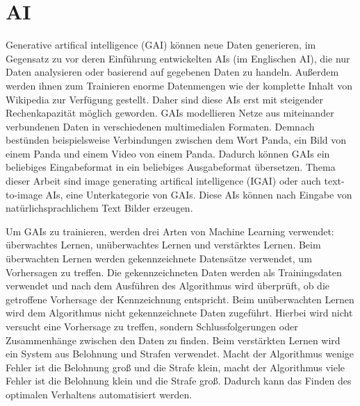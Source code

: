 \documentclass[12pt]{report}
\begin{document}
\section{AI}\label{def_ki}
Generative artifical intelligence (GAI) können neue Daten generieren, im Gegensatz zu vor deren Einführung entwickelten AIs (im Englischen AI), die nur Daten analysieren oder basierend auf gegebenen Daten zu handeln. Außerdem werden ihnen zum Trainieren enorme Datenmengen wie der komplette Inhalt von Wikipedia zur Verfügung gestellt. Daher sind diese AIs erst mit steigender Rechenkapazität möglich geworden. GAIs modellieren Netze aus miteinander verbundenen Daten in verschiedenen multimedialen Formaten. Demnach bestünden beispielsweise Verbindungen zwischen dem Wort Panda, ein Bild von einem Panda und einem Video von einem Panda. Dadurch können GAIs ein beliebiges Eingabeformat in ein beliebiges Ausgabeformat übersetzen. Thema dieser Arbeit sind image generating artifical intelligence (IGAI) oder auch text-to-image AIs, eine Unterkategorie von GAIs. Diese AIs können nach Eingabe von natürlichsprachlichem Text Bilder erzeugen.
\cite{Roberto}


Um GAIs zu trainieren, werden drei Arten von Machine Learning verwendet: überwachtes Lernen, unüberwachtes Lernen und verstärktes Lernen. 
Beim überwachten Lernen werden gekennzeichnete Datensätze verwendet, um Vorhersagen zu treffen. Die gekennzeichneten Daten werden als Trainingsdaten verwendet und nach dem Ausführen des Algorithmus wird überprüft, ob die getroffene Vorhersage der Kennzeichnung entspricht.
Beim unüberwachten Lernen wird dem Algorithmus nicht gekennzeichnete Daten zugeführt. Hierbei wird nicht versucht eine Vorhersage zu treffen, sondern Schlussfolgerungen oder Zusammenhänge zwischen den Daten zu finden.
Beim verstärkten Lernen wird ein System aus Belohnung und Strafen verwendet. Macht der Algorithmus wenige Fehler ist die Belohnung groß und die Strafe klein, macht der Algorithmus viele Fehler ist die Belohnung klein und die Strafe groß. Dadurch kann das Finden des 
optimalen Verhaltens automatisiert werden.
\cite{serafeim}



\end{document}
